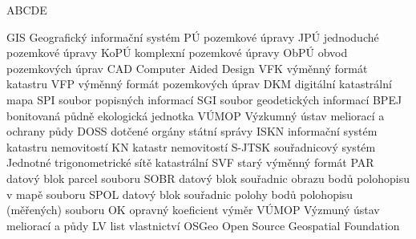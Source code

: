 
\begin{seznamzkratek}{ABCDE}

	      {GIS}
	      {Geografický informační systém}
	      {PÚ}
	      {pozemkové úpravy}
	      {JPÚ}
	      {jednoduché pozemkové úpravy}
	      {KoPÚ}
	      {komplexní pozemkové úpravy}
	      {ObPÚ}
	      {obvod pozemkových úprav}
	      {CAD}
	      {Computer Aided Design}
	      {VFK}
	      {výměnný formát katastru}
	      {VFP}
	      {výměnný formát pozemkových úprav}
	      {DKM}
	      {digitální katastrální mapa}
	      {SPI}
	      {soubor popisných informací}
	      {SGI}
	      {soubor geodetických informací}
	      {BPEJ}
	      {bonitovaná půdně ekologická jednotka}
	      {VÚMOP}
	      {Výzkumný ústav meliorací a ochrany půdy}
	      {DOSS}
	      {dotčené orgány státní správy}
	      {ISKN}
	      {informační systém katastru nemovitostí}
	      {KN}
	      {katastr nemovitostí}
	      {S-JTSK}
	      {souřadnicový systém Jednotné trigonometrické sítě katastrální}
	      {SVF}
	      {starý výměnný formát}
	      {PAR}
	      {datový blok parcel souboru }
	      {SOBR}
	      {datový blok souřadnic obrazu bodů polohopisu v mapě souboru }
	      {SPOL}
	      {datový blok souřadnic polohy bodů polohopisu (měřených) souboru }
	      {OK}
	      {opravný koeficient výměr}
	      {VÚMOP}
	      {Výzmuný ústav meliorací a půdy}
	      {LV}
	      {list vlastnictví}
	      {OSGeo}
	      {Open Source Geospatial Foundation}
	      
\end{seznamzkratek}